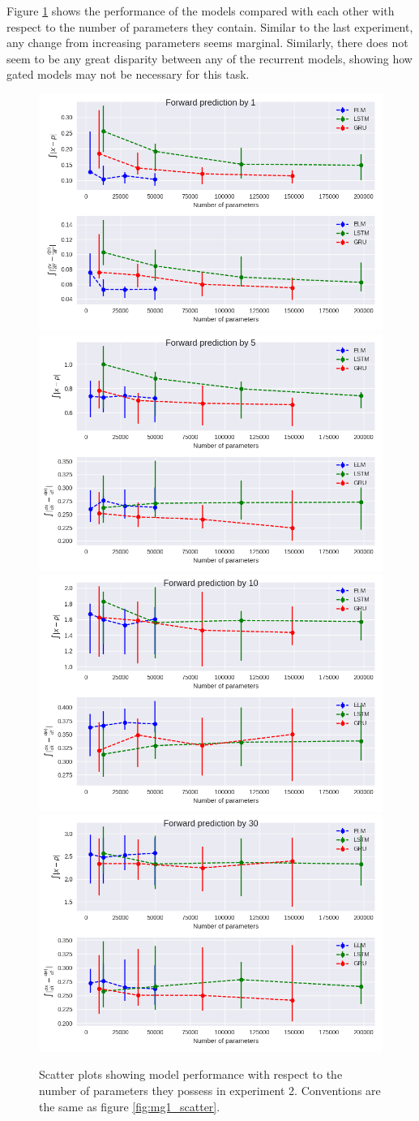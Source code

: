 \documentclass[11pt]{article}
\begin{document}
Figure \ref{fig:mg2_scatter} shows the performance of the models
compared with each other with respect to the number of parameters they
contain. Similar to the last experiment, any change from increasing parameters seems marginal. Similarly, there
does not seem to be any great disparity between any of the recurrent
models, showing how gated models may not be necessary for this task.

  \begin{figure}
    \begin{center}
  \includegraphics[width=.48\textwidth]{figures/mg2_scatter_1.png}
  \includegraphics[width=.48\textwidth]{figures/mg2_scatter_5.png}
  \includegraphics[width=.48\textwidth]{figures/mg2_scatter_10.png}
  \includegraphics[width=.48\textwidth]{figures/mg2_scatter_30.png}
       
    \caption{Scatter plots showing model performance with respect to
      the number of parameters they possess in experiment 2. Conventions are the same as figure \ref{fig:mg1_scatter}.}
    \label{fig:mg2_scatter}
    \end{center}
  \end{figure}
\end{document}
